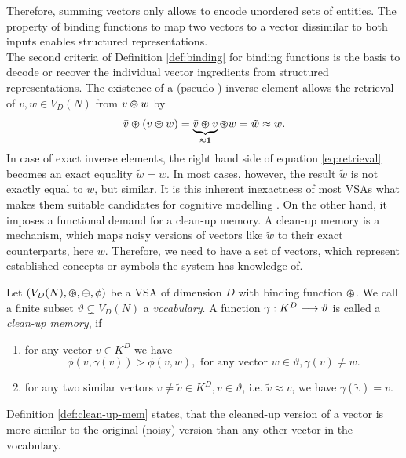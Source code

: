Therefore, summing vectors only allows to encode unordered sets of entities.
The property of binding functions to map two vectors to a vector dissimilar to both inputs enables structured representations.\\
The second criteria of Definition \ref{def:binding} for binding functions is the basis to decode or recover the individual vector ingredients from structured representations.
The existence of a (pseudo-) inverse element allows the retrieval of $v,w \in V_{D}(N)$ from $v \varoast w$ by
\begin{equation}
\label{eq:retrieval}
\bar{v} \varoast \left(v \varoast w\right) = \underbrace{\bar{v} \varoast v}_{\approx \mathbf{1}} \varoast w = \tilde{w} \approx w.
\end{equation}
In case of exact inverse elements, the right hand side of equation \ref{eq:retrieval} becomes an exact equality $\tilde{w}=w$.
In most cases, however, the result $\tilde{w}$ is not exactly equal to $w$, but similar.
It is this inherent inexactness of most \acp{VSA} what makes them suitable candidates for cognitive modelling \cite{Eliasmith2013}.
On the other hand, it imposes a functional demand for a clean-up memory.
A clean-up memory is a mechanism, which maps noisy versions of vectors like $\tilde{w}$ to their exact counterparts, here $w$.
Therefore, we need to have a set of vectors, which represent established concepts or symbols the system has knowledge of.

\begin{defn}
	\label{def:clean-up-mem}
	Let $(V_{D}(N), \varoast, \oplus, \phi)$ be a \acrfull{VSA} of dimension $D$ with binding function $\varoast$.
	We call a finite subset $\vartheta \subsetneq V_{D}(N)$ a \emph{vocabulary}.
	A function $\gamma: K^{D} \longrightarrow \vartheta$ is called a \emph{clean-up memory}, if 
	\begin{enumerate}
		\item for any vector $v\in K^{D}$ we have
		\[
		\phi\left(v, \gamma(v)\right) > \phi\left(v, w\right), \textrm{ for any vector } w \in \vartheta, \gamma(v) \neq w.
		\]
		\item for any two similar vectors $ v \neq \tilde{v} \in K^{D}, v \in \vartheta$, i.e. $\tilde{v} \approx v$, we have $\gamma(\tilde{v})=v$.
	\end{enumerate}
\end{defn}
Definition \ref{def:clean-up-mem} states, that the cleaned-up version of a vector is more similar to the original (noisy) version than any other vector in the vocabulary.

